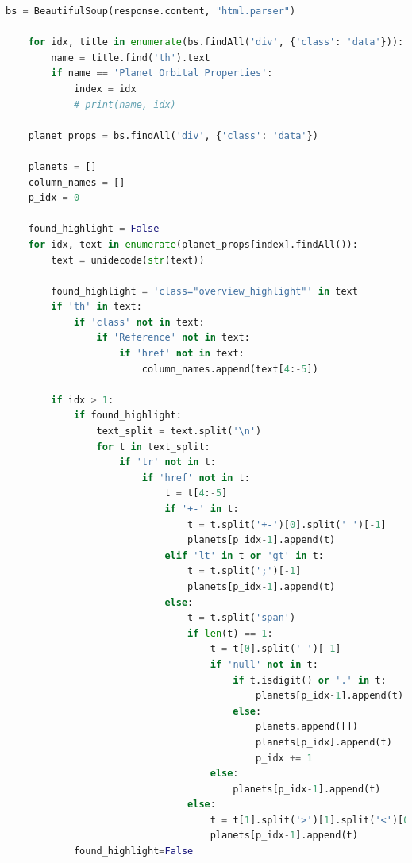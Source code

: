 \documentclass[11pt, oneside]{article}   	%
\begin{document}
\begin{lstlisting}[language=Python, caption={Extracting data from \href{https://exoplanetarchive.ipac.caltech.edu/}{Nasa Exoplanet Archive}}]
    bs = BeautifulSoup(response.content, "html.parser")

    for idx, title in enumerate(bs.findAll('div', {'class': 'data'})):
        name = title.find('th').text
        if name == 'Planet Orbital Properties':
            index = idx
            # print(name, idx)

    planet_props = bs.findAll('div', {'class': 'data'})

    planets = []
    column_names = []
    p_idx = 0

    found_highlight = False
    for idx, text in enumerate(planet_props[index].findAll()):
        text = unidecode(str(text))

        found_highlight = 'class="overview_highlight"' in text
        if 'th' in text:
            if 'class' not in text:
                if 'Reference' not in text:
                    if 'href' not in text:
                        column_names.append(text[4:-5])
                        
        if idx > 1:
            if found_highlight:
                text_split = text.split('\n')
                for t in text_split:
                    if 'tr' not in t:
                        if 'href' not in t:
                            t = t[4:-5]
                            if '+-' in t:
                                t = t.split('+-')[0].split(' ')[-1]
                                planets[p_idx-1].append(t)
                            elif 'lt' in t or 'gt' in t:
                                t = t.split(';')[-1]
                                planets[p_idx-1].append(t)
                            else:
                                t = t.split('span')
                                if len(t) == 1:
                                    t = t[0].split(' ')[-1]
                                    if 'null' not in t:
                                        if t.isdigit() or '.' in t:
                                            planets[p_idx-1].append(t)
                                        else:
                                            planets.append([])
                                            planets[p_idx].append(t)
                                            p_idx += 1
                                    else:
                                        planets[p_idx-1].append(t)
                                else:
                                    t = t[1].split('>')[1].split('<')[0]
                                    planets[p_idx-1].append(t)
            found_highlight=False


\end{lstlisting}
\end{document}
